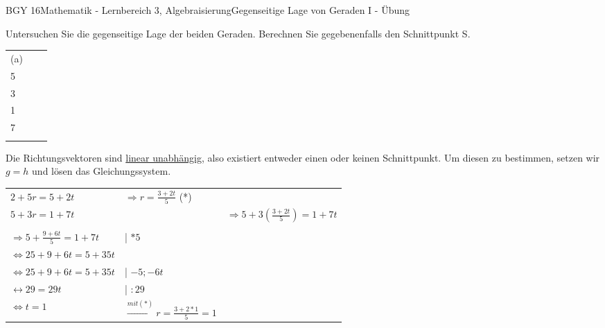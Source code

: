 \documentclass[oneside,openany,headings=optiontotoc,11pt,numbers=noenddot]{scrreprt}
\begin{document}
	\begin{worksheet}{BGY 16}{Mathematik - Lernbereich 3, Algebraisierung}{Gegenseitige Lage von Geraden I - Übung}
				
		\begin{framed}
			\noindent
			Untersuchen Sie die gegenseitige Lage der beiden Geraden. Berechnen Sie gegebenenfalls den Schnittpunkt S.\\
			\begin{tabularx}{\textwidth}{lXX}
				(a) & \(g: \vec{x} = \left(\begin{array}{c}2\\5\end{array}\right) + r\left(\begin{array}{c}5\\3\end{array}\right)\) &	\(h: \vec{x} = \left(\begin{array}{c}5\\1\end{array}\right) + t\left(\begin{array}{c}2\\7\end{array}\right)\)\\
				&&\\
			\end{tabularx}
			Die Richtungsvektoren sind \color{blue}\underline{linear unabhängig}\normalcolor{}, also existiert entweder \color{red}einen\normalcolor{} oder \color{red}keinen\normalcolor{} Schnittpunkt. Um diesen zu bestimmen, setzen wir \(g=h\) und lösen das Gleichungssystem.\\
			\par\noindent
			\begin{tabular}{lll}
				\(2+5r = 5 +2t\) & \(\Rightarrow r = \frac{3+2t}{5}\) (*)\\
				\(5+3r = 1 +7t\) & & \(\Rightarrow 5 + 3(\frac{3+2t}{5}) = 1 + 7t\)\\
				\hline\\
				\(\Rightarrow 5 + \frac{9 + 6t}{5} = 1 +7t\)& | \(* 5\)&\\
				\(\Leftrightarrow 25 + 9 +6t = 5 + 35t\) & &\\
				\(\Leftrightarrow 25 + 9 + 6t = 5 + 35t\) & | \(-5; -6t\)& \\
				\(\leftrightarrow 29 = 29t\) & | \(:29\) & \\
				\(\Leftrightarrow t = 1\) & \(\xrightarrow{mit (*)} r = \frac{3+2*1}{5} = 1\)
			\end{tabular}\\

\end{framed}
\end{worksheet}
\end{document}
